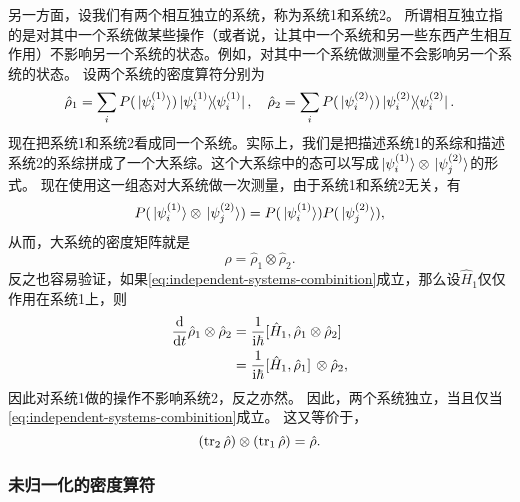 \documentclass[hyperref, UTF8, a4paper]{ctexart}
\newcommand*{\ii}{\mathrm{i}}
\begin{document}
另一方面，设我们有两个相互独立的系统，称为系统1和系统2。
所谓相互独立指的是对其中一个系统做某些操作（或者说，让其中一个系统和另一些东西产生相互作用）不影响另一个系统的状态。例如，对其中一个系统做测量不会影响另一个系统的状态。
设两个系统的密度算符分别为
\[
    \hat{\rho}_1 = \sum_i P(\ket*{\psi_i^{(1)}}) \dyad*{\psi_i^{(1)}}, \quad \hat{\rho}_2 = \sum_i P(\ket*{\psi_i^{(2)}}) \dyad*{\psi_i^{(2)}}.
\]
现在把系统1和系统2看成同一个系统。实际上，我们是把描述系统1的系综和描述系统2的系综拼成了一个大系综。这个大系综中的态可以写成$\ket*{\psi_i^{(1)}} \otimes \ket*{\psi_j^{(2)}}$的形式。
现在使用这一组态对大系统做一次测量，由于系统1和系统2无关，有
\[
    P(\ket*{\psi_i^{(1)}} \otimes \ket*{\psi_j^{(2)}}) = P(\ket*{\psi_i^{(1)}}) P(\ket*{\psi_j^{(2)}}),
\]
从而，大系统的密度矩阵就是
\begin{equation}
    \hat{\rho} = \hat{\rho}_1 \otimes \hat{\rho}_2.
    \label{eq:independent-systems-combinition}
\end{equation}
反之也容易验证，如果\eqref{eq:independent-systems-combinition}成立，那么设$\hat{H}_1$仅仅作用在系统1上，则
\[
    \begin{aligned}
        \dv{t} \hat{\rho}_1 \otimes \hat{\rho}_2 &= \frac{1}{\ii \hbar} \comm*{\hat{H}_1}{\hat{\rho}_1 \otimes \hat{\rho}_2} \\
        &= \frac{1}{\ii \hbar} \comm*{\hat{H}_1}{\hat{\rho}_1} \otimes \hat{\rho}_2,
    \end{aligned}
\]
因此对系统1做的操作不影响系统2，反之亦然。
因此，两个系统独立，当且仅当\eqref{eq:independent-systems-combinition}成立。
这又等价于，
\begin{equation}
    (\trace_2 \hat{\rho}) \otimes (\trace_1 \hat{\rho}) = \hat{\rho}.
\end{equation}

\subsubsection{未归一化的密度算符}
\end{document}
